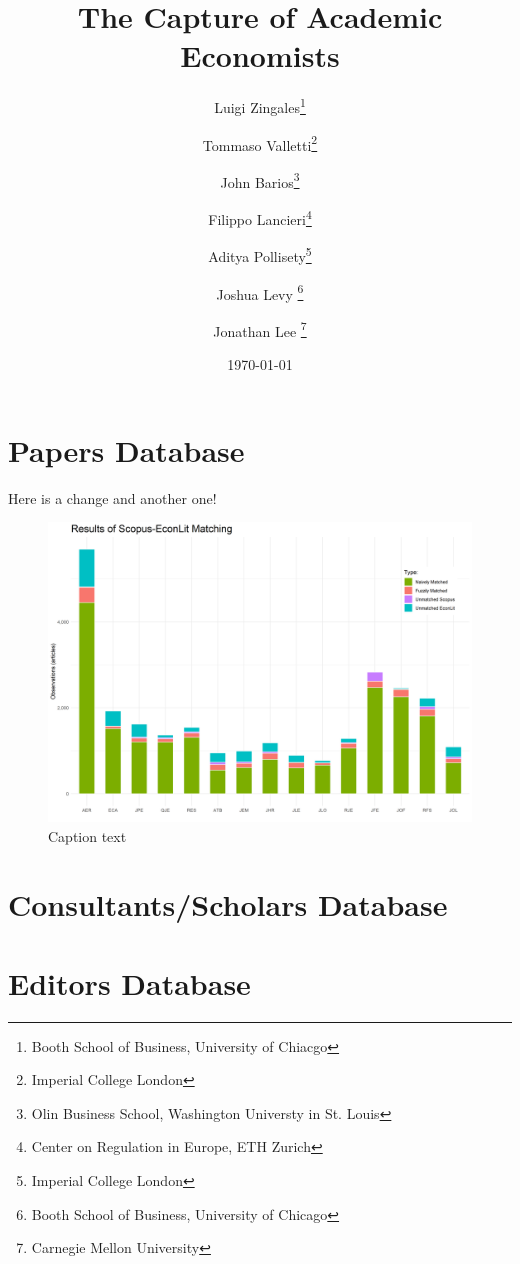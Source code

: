 \documentclass[11pt, letterpaper, twoside]{article}
\title{\singlespacing\textbf{The Capture of Academic Economists}}
\author{
    Luigi Zingales\thanks{Booth School of Business, University of Chiacgo} \\
    \and
    Tommaso Valletti\thanks{Imperial College London}\\
    \and
    John Barios\thanks{Olin Business School, Washington Universty in St. Louis}\\
    \and
    Filippo Lancieri\thanks{Center on Regulation in Europe, ETH Zurich} \\
    \and
    Aditya Pollisety\thanks{Imperial College London}\\
    \and
    Joshua Levy \thanks{Booth School of Business, University of Chicago}\\
    \and
    Jonathan Lee \thanks{Carnegie Mellon University}
    }
\date{\today}
\begin{document}
\begin{titlepage}
    \maketitle
    \thispagestyle{empty}
\end{titlepage}


\newpage
{}

\section{Papers Database}


Here is a change and another one!




\begin{figure}[h]
    \centering    
    \includegraphics[width=\textwidth]{figures/scopus_econlit_matching_results.png}
    \caption{Caption text}
\end{figure}


\newpage
\begin{landscape}
    \thispagestyle{empty}
        
\end{landscape}
\newpage
\begin{landscape}
    \thispagestyle{empty}
        
\end{landscape}
\newpage
\begin{landscape}
    \thispagestyle{empty}
    \vspace{\linewidth}
    
\end{landscape}
    

    







\section{Consultants/Scholars Database}


\section{Editors Database}
\end{document}
